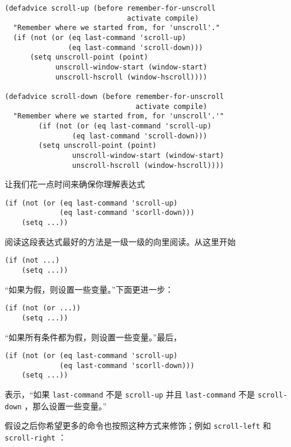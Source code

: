\begin{verbatim}
(defadvice scroll-up (before remember-for-unscroll
                             activate compile)
  "Remember where we started from, for 'unscroll'."
  (if (not (or (eq last-command 'scroll-up)
               (eq last-command 'scroll-down)))
      (setq unscroll-point (point)
            unscroll-window-start (window-start)
            unscroll-hscroll (window-hscroll))))

(defadvice scroll-down (before remember-for-unscroll
                               activate compile)
  "Remember where we started from, for 'unscroll'.'"
        (if (not (or (eq last-command 'scroll-up)
                (eq last-command 'scroll-down)))
        (setq unscroll-point (point)
                unscroll-window-start (window-start)
                unscroll-hscroll (window-hscroll))))
\end{verbatim}

让我们花一点时间来确保你理解表达式

\begin{verbatim}
(if (not (or (eq last-command 'scroll-up)
             (eq last-command 'scorll-down)))
    (setq ...))
\end{verbatim}

阅读这段表达式最好的方法是一级一级的向里阅读。从这里开始

\begin{verbatim}
(if (not ...)
    (setq ...))
\end{verbatim}

“如果为假，则设置一些变量。”下面更进一步：

\begin{verbatim}
(if (not (or ...))
    (setq ...))
\end{verbatim}

“如果所有条件都为假，则设置一些变量。”最后，

\begin{verbatim}
(if (not (or (eq last-command 'scroll-up)
             (eq last-command 'scorll-down)))
    (setq ...))
\end{verbatim}

表示，“如果 \texttt{last-command} 不是 \texttt{scroll-up} 并且 \texttt{last-command} 不是 \texttt{scroll-down} ，那么设置一些变量。”

假设之后你希望更多的命令也按照这种方式来修饰；例如 \texttt{scroll-left} 和 \texttt{scroll-right} ：

